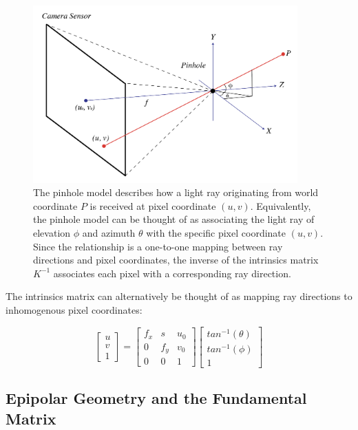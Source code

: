 \documentclass[openany]{book}
\begin{document}
\begin{figure}[htbp]
    \centering 
    \includegraphics[width=4in]{images/pinhole.png}
    \caption{The pinhole model describes how a light ray originating from world coordinate $P$ is received at pixel coordinate $(u, v)$. Equivalently, the pinhole model can be thought of as associating the light ray of elevation $\phi$ and azimuth $\theta$ with the specific pixel coordinate $(u, v)$. Since the relationship is a one-to-one mapping between ray directions and pixel coordinates, the inverse of the intrinsics matrix $K^{-1}$ associates each pixel with a corresponding ray direction.}
\end{figure}

The intrinsics matrix can alternatively be thought of as mapping ray directions to inhomogenous pixel coordinates:

\begin{equation}
    \begin{bmatrix}
        u\\
        v\\
        1
    \end{bmatrix} = 
    \begin{bmatrix}
        f_x & s & u_0 \\ 
        0 & f_y  & v_0 \\ 
        0 & 0 & 1 
    \end{bmatrix}
    \begin{bmatrix}
        tan^{-1}(\theta) \\
        tan^{-1}(\phi) \\
        1
    \end{bmatrix}
    \end{equation}



\subsection{Epipolar Geometry and the Fundamental Matrix}
\end{document}
